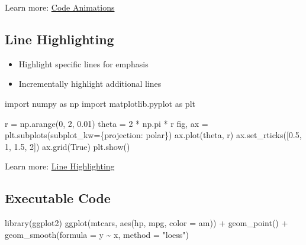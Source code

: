 \documentclass[
  letterpaper,
  DIV=11,
  numbers=noendperiod]{scrartcl}
\newenvironment{Shaded}{\begin{snugshade}}{\end{snugshade}}
\newcommand{\AttributeTok}[1]{\textcolor[rgb]{0.40,0.45,0.13}{#1}}
\newcommand{\DecValTok}[1]{\textcolor[rgb]{0.68,0.00,0.00}{#1}}
\newcommand{\FloatTok}[1]{\textcolor[rgb]{0.68,0.00,0.00}{#1}}
\newcommand{\FunctionTok}[1]{\textcolor[rgb]{0.28,0.35,0.67}{#1}}
\newcommand{\ImportTok}[1]{\textcolor[rgb]{0.00,0.46,0.62}{#1}}
\newcommand{\NormalTok}[1]{\textcolor[rgb]{0.00,0.23,0.31}{#1}}
\newcommand{\OperatorTok}[1]{\textcolor[rgb]{0.37,0.37,0.37}{#1}}
\newcommand{\SpecialCharTok}[1]{\textcolor[rgb]{0.37,0.37,0.37}{#1}}
\newcommand{\StringTok}[1]{\textcolor[rgb]{0.13,0.47,0.30}{#1}}
\newcommand{\VariableTok}[1]{\textcolor[rgb]{0.07,0.07,0.07}{#1}}
\providecommand{\tightlist}{%
  \setlength{\itemsep}{0pt}\setlength{\parskip}{0pt}}\usepackage{longtable,booktabs,array}
\begin{document}
Learn more:
\href{https://quarto.org/docs/presentations/revealjs/advanced.html\#code-animations}{Code
Animations}

\hypertarget{line-highlighting}{%
\subsection{Line Highlighting}\label{line-highlighting}}

\begin{itemize}
\tightlist
\item
  Highlight specific lines for emphasis
\item
  Incrementally highlight additional lines
\end{itemize}

\begin{Shaded}
\begin{Highlighting}[numbers=left,,]
\ImportTok{import}\NormalTok{ numpy }\ImportTok{as}\NormalTok{ np}
\ImportTok{import}\NormalTok{ matplotlib.pyplot }\ImportTok{as}\NormalTok{ plt}

\NormalTok{r }\OperatorTok{=}\NormalTok{ np.arange(}\DecValTok{0}\NormalTok{, }\DecValTok{2}\NormalTok{, }\FloatTok{0.01}\NormalTok{)}
\NormalTok{theta }\OperatorTok{=} \DecValTok{2} \OperatorTok{*}\NormalTok{ np.pi }\OperatorTok{*}\NormalTok{ r}
\NormalTok{fig, ax }\OperatorTok{=}\NormalTok{ plt.subplots(subplot\_kw}\OperatorTok{=}\NormalTok{\{}\StringTok{\textquotesingle{}projection\textquotesingle{}}\NormalTok{: }\StringTok{\textquotesingle{}polar\textquotesingle{}}\NormalTok{\})}
\NormalTok{ax.plot(theta, r)}
\NormalTok{ax.set\_rticks([}\FloatTok{0.5}\NormalTok{, }\DecValTok{1}\NormalTok{, }\FloatTok{1.5}\NormalTok{, }\DecValTok{2}\NormalTok{])}
\NormalTok{ax.grid(}\VariableTok{True}\NormalTok{)}
\NormalTok{plt.show()}
\end{Highlighting}
\end{Shaded}

Learn more:
\href{https://quarto.org/docs/presentations/revealjs/\#line-highlighting}{Line
Highlighting}

\hypertarget{executable-code}{%
\subsection{Executable Code}\label{executable-code}}

\begin{Shaded}
\begin{Highlighting}[]
\FunctionTok{library}\NormalTok{(ggplot2)}
\FunctionTok{ggplot}\NormalTok{(mtcars, }\FunctionTok{aes}\NormalTok{(hp, mpg, }\AttributeTok{color =}\NormalTok{ am)) }\SpecialCharTok{+}
  \FunctionTok{geom\_point}\NormalTok{() }\SpecialCharTok{+}
  \FunctionTok{geom\_smooth}\NormalTok{(}\AttributeTok{formula =}\NormalTok{ y }\SpecialCharTok{\textasciitilde{}}\NormalTok{ x, }\AttributeTok{method =} \StringTok{"loess"}\NormalTok{)}
\end{Highlighting}
\end{Shaded}
\end{document}
